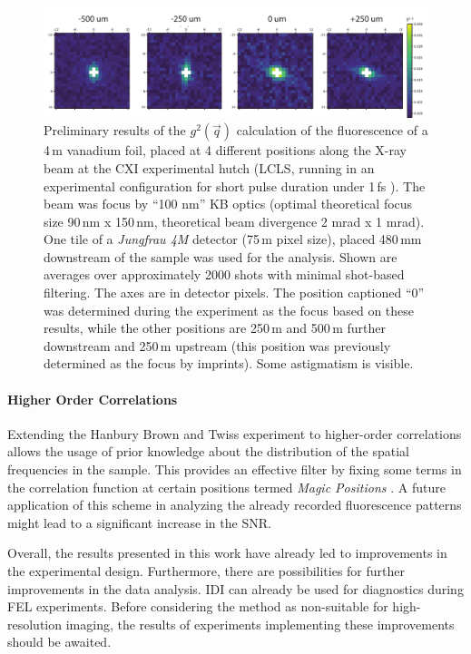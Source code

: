 \begin{figure}[p]
	\centering
	\includegraphics[width=\linewidth]{images/lv65_vanadium.pdf}
	
	\caption[Focus finding using IDI]{Preliminary results of the $g^2(\vec{q})$ calculation of the fluorescence of a 4\,\textmu m vanadium foil, placed at 4 different positions along the X-ray beam at the CXI experimental hutch (LCLS, running in an experimental configuration for short pulse duration under 1\,fs \cite{subfs2017,argosecond}). The beam was focus by \enquote{100 nm} KB optics (optimal theoretical focus size 90\,nm x 150\,nm, theoretical beam divergence 2 mrad x 1 mrad). One tile of a \textit{Jungfrau 4M} detector (75\,\textmu m pixel size), placed 480\,mm downstream of the sample was used for the analysis. Shown are averages over approximately 2000 shots with minimal shot-based filtering. The axes are in detector pixels. The position captioned \enquote{0} was determined during the experiment as the focus based on these results, while the other positions are 250\,\textmu m and 500\,\textmu m further downstream and 250\,\textmu m upstream (this position was previously determined as the focus by imprints).  Some astigmatism is visible.}
	\label{fig:outlook_vanadium}
\end{figure}

\paragraph{Higher Order Correlations}
Extending the Hanbury Brown and Twiss experiment to higher-order correlations allows the usage of prior knowledge about the distribution of the spatial frequencies in the sample. This provides an effective filter by fixing some terms in the correlation function at certain positions termed \textit{Magic Positions} \cite{schneider2018,thiel2007}. A future application of this scheme in analyzing the already recorded fluorescence patterns might lead to a significant increase in the SNR.

\vspace{0.5cm}
Overall, the results presented in this work have already led to improvements in the experimental design. Furthermore, there are possibilities for further improvements in the data analysis. IDI can already be used for diagnostics during FEL experiments. Before considering the method as non-suitable for high-resolution imaging, the results of experiments implementing these improvements should be awaited.


